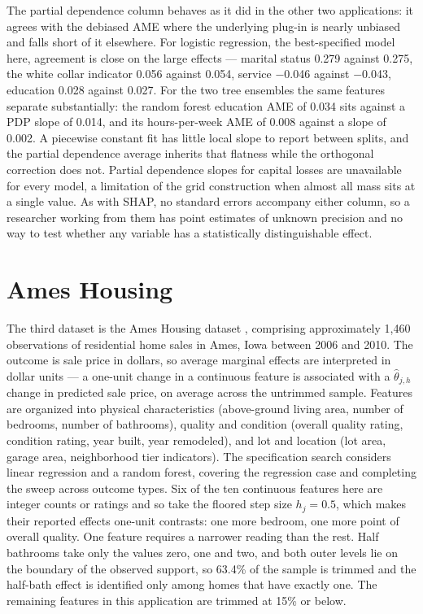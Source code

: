 \documentclass[12pt,a4paper]{article}
\numberwithin{equation}{section}
\theoremstyle{plain}
\theoremstyle{definition}
\begin{document}
	The partial dependence column behaves as it did in the other two applications: it agrees with the debiased AME where the underlying plug-in is nearly unbiased and falls short of it elsewhere. For logistic regression, the best-specified model here, agreement is close on the large effects --- marital status 0.279 against 0.275, the white collar indicator 0.056 against 0.054, service $-$0.046 against $-$0.043, education 0.028 against 0.027. For the two tree ensembles the same features separate substantially: the random forest education AME of 0.034 sits against a PDP slope of 0.014, and its hours-per-week AME of 0.008 against a slope of 0.002. A piecewise constant fit has little local slope to report between splits, and the partial dependence average inherits that flatness while the orthogonal correction does not. Partial dependence slopes for capital losses are unavailable for every model, a limitation of the grid construction when almost all mass sits at a single value. As with SHAP, no standard errors accompany either column, so a researcher working from them has point estimates of unknown precision and no way to test whether any variable has a statistically distinguishable effect.
	
	\section{Ames Housing}
	\label{app:ames}
	
	The third dataset is the Ames Housing dataset \citep{decock2011}, comprising approximately 1,460 observations of residential home sales in Ames, Iowa between 2006 and 2010. The outcome is sale price in dollars, so average marginal effects are interpreted in dollar units --- a one-unit change in a continuous feature is associated with a $\widehat{\theta}_{j,h}$ change in predicted sale price, on average across the untrimmed sample. Features are organized into physical characteristics (above-ground living area, number of bedrooms, number of bathrooms), quality and condition (overall quality rating, condition rating, year built, year remodeled), and lot and location (lot area, garage area, neighborhood tier indicators). The specification search considers linear regression and a random forest, covering the regression case and completing the sweep across outcome types. Six of the ten continuous features here are integer counts or ratings and so take the floored step size $h_j = 0.5$, which makes their reported effects one-unit contrasts: one more bedroom, one more point of overall quality. One feature requires a narrower reading than the rest. Half bathrooms take only the values zero, one and two, and both outer levels lie on the boundary of the observed support, so 63.4\% of the sample is trimmed and the half-bath effect is identified only among homes that have exactly one. The remaining features in this application are trimmed at 15\% or below.
	
\end{document}
